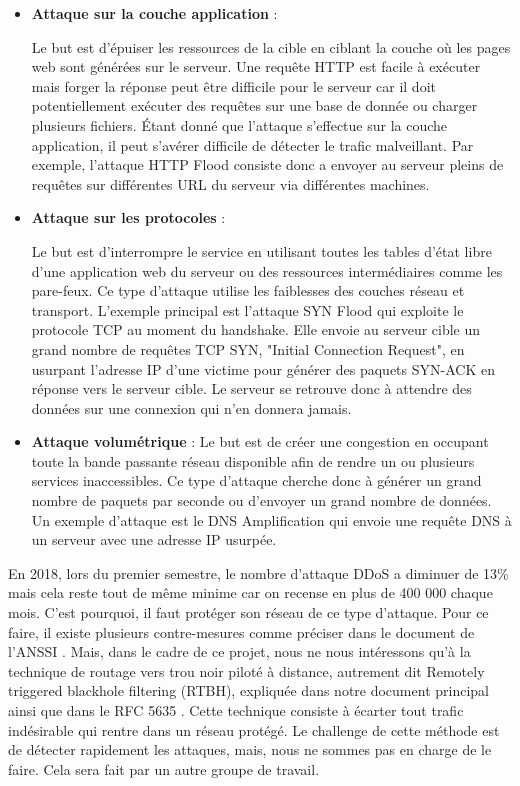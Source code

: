 \begin{itemize}
    \item \textbf{Attaque sur la couche application} : 
    
    Le but est d'épuiser les ressources de la cible en ciblant la couche où les pages web sont générées sur le serveur. Une requête HTTP est facile à exécuter mais forger la réponse peut être difficile pour le serveur car il doit potentiellement exécuter des requêtes sur une base de donnée ou charger plusieurs fichiers. Étant donné que l'attaque s'effectue sur la couche application, il peut s'avérer difficile de détecter le trafic malveillant. Par exemple, l'attaque HTTP Flood consiste donc a envoyer au serveur pleins de requêtes sur différentes URL du serveur via différentes machines.  
    
    \item \textbf{Attaque sur les protocoles} : 
    
    Le but est d'interrompre le service en utilisant toutes les tables d'état libre d'une application web du serveur ou des ressources intermédiaires comme les pare-feux. Ce type d'attaque utilise les faiblesses des couches réseau et transport. L'exemple principal est l'attaque SYN Flood qui exploite le protocole TCP au moment du handshake. Elle envoie au serveur cible un grand nombre de requêtes TCP SYN, "Initial Connection Request", en usurpant l'adresse IP d'une victime pour générer des paquets SYN-ACK en réponse vers le serveur cible. Le serveur se retrouve donc à attendre des données sur une connexion qui n'en donnera jamais.
    
    \item \textbf{Attaque volumétrique} : Le but est de créer une congestion en occupant toute la bande passante réseau disponible afin de rendre un ou plusieurs services inaccessibles. Ce type d'attaque cherche donc à générer un grand nombre de paquets par seconde ou d'envoyer un grand nombre de données. Un exemple d'attaque est le DNS Amplification qui envoie une requête DNS à un serveur avec une adresse IP usurpée.
\end{itemize}

En 2018, lors du premier semestre, le nombre d'attaque DDoS a diminuer de 13\% mais cela reste tout de même minime car on recense en plus de 400 000 chaque mois. C'est pourquoi, il faut protéger son réseau de ce type d'attaque. Pour ce faire, il existe plusieurs contre-mesures comme préciser dans le document de l'ANSSI \cite{Ans15}. Mais, dans le cadre de ce projet, nous ne nous intéressons qu'à la technique de routage vers trou noir piloté à distance, autrement dit Remotely triggered blackhole filtering (RTBH), expliquée dans notre document principal \cite{Sys05} ainsi que dans le RFC 5635 \cite{Rfcrtbh09}. Cette technique consiste à écarter tout trafic indésirable qui rentre dans un réseau protégé. Le challenge de cette méthode est de détecter rapidement les attaques, mais, nous ne sommes pas en charge de le faire. Cela sera fait par un autre groupe de travail. 

